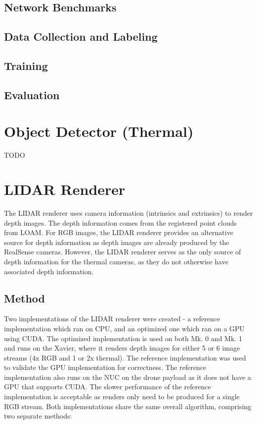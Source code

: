 \subsection{Network Benchmarks}
\subsection{Data Collection and Labeling}
\subsection{Training}
\subsection{Evaluation}

\section{Object Detector (Thermal)}
TODO

\section{LIDAR Renderer}

The LIDAR renderer uses camera information (intrinsics and extrinsics) to render depth images. The depth information comes from the registered point clouds from LOAM. For RGB images, the LIDAR renderer provides an alternative source for depth information as depth images are already produced by the RealSense cameras. However, the LIDAR renderer serves as the only source of depth information for the thermal cameras, as they do not otherwise have associated depth information.

\subsection{Method}

Two implementations of the LIDAR renderer were created - a reference implementation which ran on CPU, and an optimized one which ran on a GPU using CUDA. The optimized implementation is used on both Mk. 0 and Mk. 1 and runs on the Xavier, where it renders depth images for either 5 or 6 image streams (4x RGB and 1 or 2x thermal). The reference implementation was used to validate the GPU implementation for correctness. The reference implementation also runs on the NUC on the drone payload as it does not have a GPU that supports CUDA. The slower performance of the reference implementation is acceptable as renders only need to be produced for a single RGB stream. Both implementations share the same overall algorithm, comprising two separate methods:

